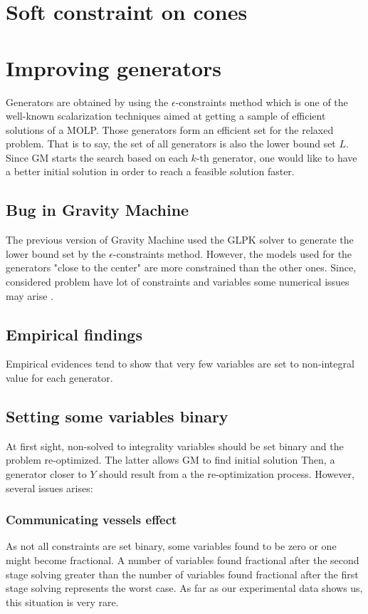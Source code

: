 \section{Soft constraint on cones}


\section{Improving generators}
Generators are obtained by using the $\epsilon$-constraints method which is one of the well-known scalarization techniques \cite{Chankong1983MultiobjectiveDM} aimed at getting a sample of efficient solutions of a MOLP. Those generators form an efficient set for the relaxed problem. That is to say, the set of all generators is also the lower bound set $L$. Since GM starts the search based on each $k$-th generator, one would like to have a better initial solution in order to reach a feasible solution faster.

\subsection{Bug in Gravity Machine}
The previous version of Gravity Machine used the GLPK solver to generate the lower bound set by the $\epsilon$-constraints method. However, the models used for the generators "close to the center" are more constrained than the other ones. Since, considered problem have lot of constraints and variables some numerical issues may arise \cite{gurobiNumIssues}.
\subsection{Empirical findings}
Empirical evidences tend to show that very few variables are set to non-integral value for each generator.

\subsection{Setting some variables binary}
At first sight, non-solved to integrality variables should be set binary and the problem re-optimized. The latter allows GM to find initial solution Then, a generator closer to $Y$ should result from a the re-optimization process. However, several issues arises:

\subsubsection{Communicating vessels effect}
As not all constraints are set binary, some variables found to be zero or one might become fractional. A number of variables found fractional after the second stage solving greater than the number of variables found fractional after the first stage solving represents the worst case. 
As far as our experimental data shows us, this situation is very rare.
